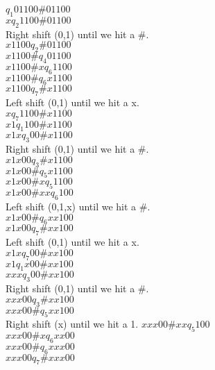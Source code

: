 \documentclass[12pt]{article}
\begin{document}
$                     q_1 01100 \# 01100$ \\
$x                    q_2  1100 \# 01100$ \\
Right shift (0,1) until we hit a $\#$.  \\
$x1100                q_2       \# 01100$ \\
$x1100 \#             q_4          01100$ \\
$x1100 \# x           q_6           1100$ \\
$x1100 \#             q_6          x1100$ \\
$x1100                q_7       \# x1100$ \\
Left shift (0,1) until we hit a x.      \\
$x                    q_7  1100 \# x1100$ \\
$x1                   q_1   100 \# x1100$ \\
$x1x                  q_3    00 \# x1100$ \\
Right shift (0,1) until we hit a $\#$.  \\
$x1x00                q_3       \# x1100$ \\
$x1x00 \#             q_5          x1100$ \\
$x1x00 \# x           q_5           1100$ \\
$x1x00 \# xx          q_6            100$ \\
Left shift (0,1,x) until we hit a $\#$.  \\
$x1x00 \#             q_6          xx100$ \\
$x1x00                q_7       \# xx100$ \\
Left shift (0,1) until we hit a x.        \\
$x1x                  q_7    00 \# xx100$ \\
$x1                   q_1   x00 \# xx100$ \\
$xxx                  q_3    00 \# xx100$ \\
Right shift (0,1) until we hit a $\#$.  \\
$xxx00                q_3       \# xx100$ \\
$xxx00 \#             q_5          xx100$ \\
Right shift (x) until we hit a 1.
$xxx00 \# xx          q_5            100$ \\
$xxx00 \# x           q_6           xx00$ \\
$xxx00 \#             q_6          xxx00$ \\
$xxx00                q_7       \# xxx00$ \\
\end{document}
